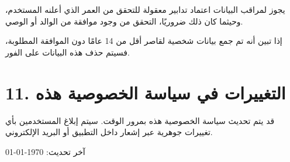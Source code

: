 \documentclass[a4paper,12pt]{article}
\begin{document}
    يجوز لمراقب البيانات اعتماد تدابير معقولة للتحقق من العمر الذي أعلنه المستخدم، وحيثما كان ذلك ضروريًا، التحقق من وجود موافقة من الوالد أو الوصي.

    إذا تبين أنه تم جمع بيانات شخصية لقاصر أقل من 14 عامًا دون الموافقة المطلوبة، فسيتم حذف هذه البيانات على الفور.

    \section*{11. التغييرات في سياسة الخصوصية هذه}

    قد يتم تحديث سياسة الخصوصية هذه بمرور الوقت.
    سيتم إبلاغ المستخدمين بأي تغييرات جوهرية عبر إشعار داخل التطبيق أو البريد الإلكتروني.

    \vspace{1cm}

    \noindent
    آخر تحديث: \today
\end{document}
